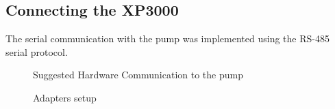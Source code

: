 \documentclass[letterpaper,10pt,english]{sphinxmanual}
\begin{document}
\subsection{Connecting the XP3000}
\label{hardware:connecting-the-xp3000}
The serial communication with the pump was implemented using the RS-485 serial
protocol.
\begin{figure}[htbp]
\centering
\capstart

\caption{Suggested Hardware Communication to the pump}\label{hardware:hardware-conf}\end{figure}
\begin{figure}[htbp]
\centering
\capstart

\caption{Adapters setup}\label{hardware:adapters}\end{figure}
\end{document}

